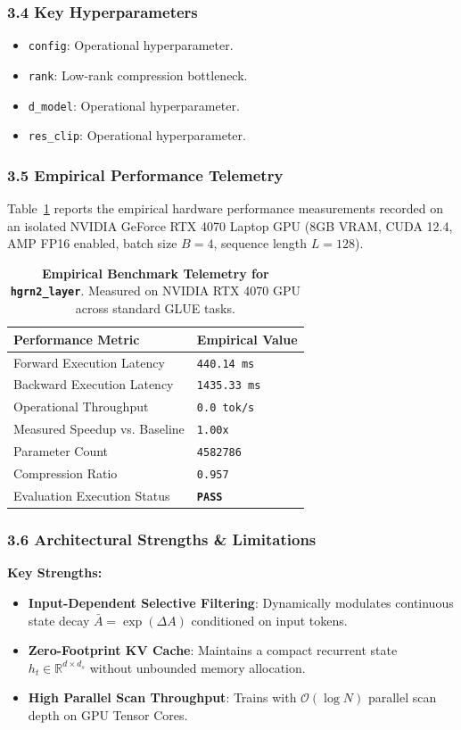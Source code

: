 \subsubsection*{3.4 Key Hyperparameters}
\begin{itemize}
    \item \texttt{config}: Operational hyperparameter.
    \item \texttt{rank}: Low-rank compression bottleneck.
    \item \texttt{d\_model}: Operational hyperparameter.
    \item \texttt{res\_clip}: Operational hyperparameter.
\end{itemize}

\subsubsection*{3.5 Empirical Performance Telemetry}
Table~\ref{tab:telemetry_hgrn2\_layer} reports the empirical hardware performance measurements recorded on an isolated NVIDIA GeForce RTX 4070 Laptop GPU (8GB VRAM, CUDA 12.4, AMP FP16 enabled, batch size $B=4$, sequence length $L=128$).

\begin{table}[h]
\centering
\small
\caption{\textbf{Empirical Benchmark Telemetry for \texttt{hgrn2\_layer}}. Measured on NVIDIA RTX 4070 GPU across standard GLUE tasks.}
\label{tab:telemetry_hgrn2\_layer}
\begin{tabularx}{\columnwidth}{lX}
\toprule
\textbf{Performance Metric} & \textbf{Empirical Value} \\
\midrule
Forward Execution Latency & \texttt{440.14 ms} \\
Backward Execution Latency & \texttt{1435.33 ms} \\
Operational Throughput & \texttt{0.0 tok/s} \\
Measured Speedup vs. Baseline & \texttt{1.00x} \\
Parameter Count & \texttt{4582786} \\
Compression Ratio & \texttt{0.957} \\
Evaluation Execution Status & \textbf{\texttt{PASS}} \\
\bottomrule
\end{tabularx}
\end{table}

\subsubsection*{3.6 Architectural Strengths \& Limitations}
\textbf{Key Strengths:}
\begin{itemize}
    \item \textbf{Input-Dependent Selective Filtering}: Dynamically modulates continuous state decay $\bar{A} = \exp(\Delta A)$ conditioned on input tokens.
    \item \textbf{Zero-Footprint KV Cache}: Maintains a compact recurrent state $h_t \in \mathbb{R}^{d \times d_s}$ without unbounded memory allocation.
    \item \textbf{High Parallel Scan Throughput}: Trains with $\mathcal{O}(\log N)$ parallel scan depth on GPU Tensor Cores.
\end{itemize}

